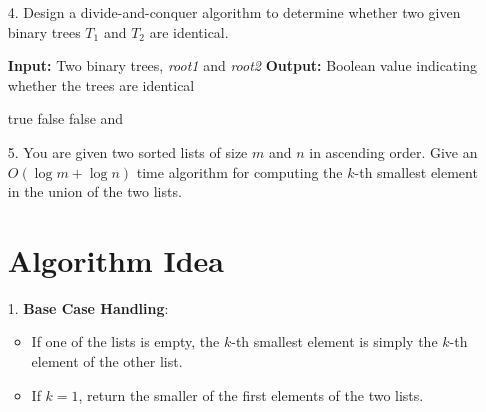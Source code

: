 \documentclass{article}
\begin{document}
\begin{itemize}
\FloatBarrier %

\item[4.] Design a divide-and-conquer algorithm to determine whether two given binary trees $T_1$ and $T_2$ are identical.

\begin{center}
\begin{algorithmic}[1]
    \State \textbf{Input:} Two binary trees, \textit{root1} and \textit{root2}
    \State \textbf{Output:} Boolean value indicating whether the trees are identical

            \State \Return true
        \EndIf
            \State \Return false
        \EndIf
            \State \Return false
        \EndIf
        \State \Return {} and 
    \EndFunction
\end{algorithmic}
\end{center}

\FloatBarrier %

\item[5.] You are given two sorted lists of size $m$ and $n$ in ascending order. Give an $O(\log m + \log n)$ time algorithm for computing the $k$-th smallest element in the union of the two lists.

\section*{Algorithm Idea}

1. \textbf{Base Case Handling}:
   \begin{itemize}
       \item If one of the lists is empty, the $k$-th smallest element is simply the $k$-th element of the other list.
       \item If $k = 1$, return the smaller of the first elements of the two lists.
   \end{itemize}


\end{itemize}
\end{document}
